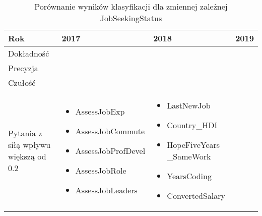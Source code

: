 \noindent\begin{minipage}{\textwidth}
             \begin{table}[H]
                 \raggedright\caption{Porównanie wyników klasyfikacji dla zmiennej zależnej JobSeekingStatus\label{tabela:JobSeekingStatusClassification}}
                 \begin{center}
                     \begin{tabular}{|P{.1\textwidth}|P{.26\textwidth}|P{.26\textwidth}|P{.26\textwidth}|}

                         \hline
                         Rok        & 2017             & 2018           & 2019            \\
                         \hline
                         Dokładność &  &  &  \\
                         \hline
                         Precyzja   &  &  &   \\
                         \hline
                         Czułość    &  &  &   \\
                         \hline
                         Pytania z siłą wpływu większą od 0.2 &
                         \begin{itemize}
                             \item AssessJobExp
                             \item AssessJobCommute
                             \item AssessJobProfDevel
                             \item AssessJobRole
                             \item AssessJobLeaders
                         \end{itemize} &
                         \begin{itemize}
                             \item LastNewJob
                             \item Country\_HDI
                             \item HopeFiveYears \_SameWork
                             \item YearsCoding
                             \item ConvertedSalary
                         \end{itemize} &
                         \begin{itemize}

\end{itemize}
\end{tabular}
\end{center}
\end{table}
\end{minipage}
